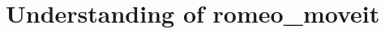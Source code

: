 \documentclass[12pt,a4paper,final,twoside,openright]{report}
\begin{document}



\section{Understanding of romeo\_moveit}


\end{document}

